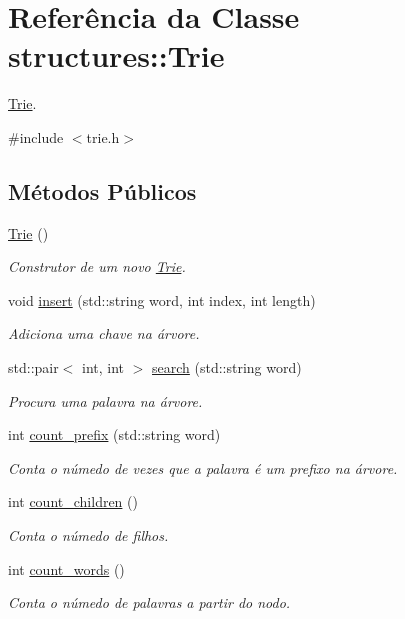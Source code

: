\hypertarget{classstructures_1_1Trie}{}\section{Referência da Classe structures\+:\+:Trie}
\label{classstructures_1_1Trie}


\hyperlink{classstructures_1_1Trie}{Trie}.  




{\ttfamily \#include $<$trie.\+h$>$}

\subsection*{Métodos Públicos}
\begin{DoxyCompactItemize}
\item 
\hyperlink{classstructures_1_1Trie_af6cf71564b040dfc62bbdedbbab8271a}{Trie} ()
\begin{DoxyCompactList}\small\item\em Construtor de um novo \hyperlink{classstructures_1_1Trie}{Trie}. \end{DoxyCompactList}\item 
void \hyperlink{classstructures_1_1Trie_a7ad7b43b69ec6ae396de427bb5657445}{insert} (std\+::string word, int index, int length)
\begin{DoxyCompactList}\small\item\em Adiciona uma chave na árvore. \end{DoxyCompactList}\item 
std\+::pair$<$ int, int $>$ \hyperlink{classstructures_1_1Trie_a48aa6b17233e4544aa479035cfae3643}{search} (std\+::string word)
\begin{DoxyCompactList}\small\item\em Procura uma palavra na árvore. \end{DoxyCompactList}\item 
int \hyperlink{classstructures_1_1Trie_a6be483584143be5bdb2faff56e1e1c2c}{count\+\_\+prefix} (std\+::string word)
\begin{DoxyCompactList}\small\item\em Conta o númedo de vezes que a palavra é um prefixo na árvore. \end{DoxyCompactList}\item 
int \hyperlink{classstructures_1_1Trie_af4cd9c96d1bcc79ab4aa1f107d6dbffd}{count\+\_\+children} ()
\begin{DoxyCompactList}\small\item\em Conta o númedo de filhos. \end{DoxyCompactList}\item 
int \hyperlink{classstructures_1_1Trie_a770d35e02fc8762e2eabf5d717602916}{count\+\_\+words} ()
\begin{DoxyCompactList}\small\item\em Conta o númedo de palavras a partir do nodo. \end{DoxyCompactList}\end{DoxyCompactItemize}


